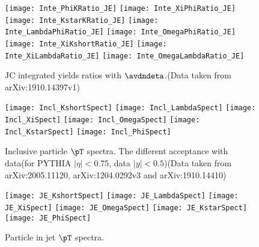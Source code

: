 \begin{figure}[ht]
	\begin{center}	
		\texttt{[image: Inte\_PhiKRatio\_JE]}		
		\texttt{[image: Inte\_XiPhiRatio\_JE]}
		\texttt{[image: Inte\_KstarKRatio\_JE]}
		\texttt{[image: Inte\_LambdaPhiRatio\_JE]}
		\texttt{[image: Inte\_OmegaPhiRatio\_JE]}
		\texttt{[image: Inte\_XiKshortRatio\_JE]}
		\texttt{[image: Inte\_XiLambdaRatio\_JE]}
		\texttt{[image: Inte\_OmegaLambdaRatio\_JE]}
	\end{center}
	\caption{JC integrated yields ratios with $\avdndeta$.(Data taken from arXiv:1910.14397v1)}
	\label{fig:JCInteParRatio}
\end{figure}

\begin{figure}[ht]
        \begin{center}
                \texttt{[image: Incl\_KshortSpect]}
                \texttt{[image: Incl\_LambdaSpect]}
                \texttt{[image: Incl\_XiSpect]}
                \texttt{[image: Incl\_OmegaSpect]}
                \texttt{[image: Incl\_KstarSpect]}
                \texttt{[image: Incl\_PhiSpect]}
        \end{center}
	\caption{Inclusive particle $\pT$ spectra. The different acceptance with data(for PYTHIA $|\eta|<0.75$, data $|y|<0.5$)(Data taken from arXiv:2005.11120, arXiv:1204.0292v3 and arXiv:1910.14410)}
        \label{fig:InclParSpect}
\end{figure}


\begin{figure}[ht]
	\begin{center}
		\texttt{[image: JE\_KshortSpect]}
		\texttt{[image: JE\_LambdaSpect]}
		\texttt{[image: JE\_XiSpect]}
		\texttt{[image: JE\_OmegaSpect]}
		\texttt{[image: JE\_KstarSpect]}
		\texttt{[image: JE\_PhiSpect]}
	\end{center}
	\caption{Particle in jet $\pT$ spectra.}
	\label{fig:JEParSpect}
\end{figure}

